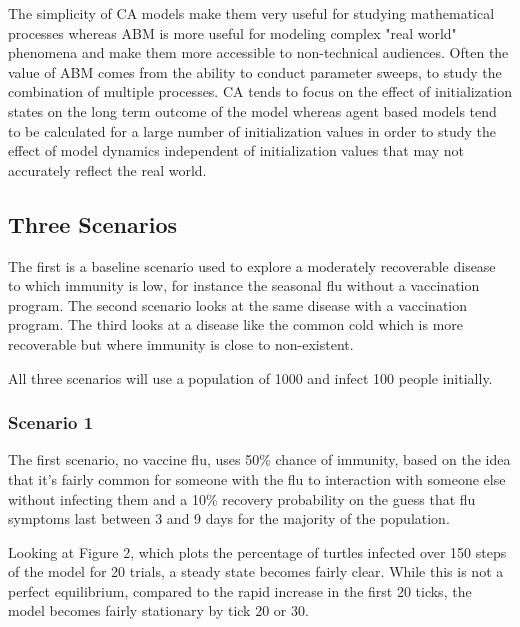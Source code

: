 \documentclass[11pt]{article} %
\begin{document}
The simplicity of CA models make them very useful for studying mathematical processes whereas ABM is more useful for modeling complex "real world" phenomena and make them more accessible to non-technical audiences. Often the value of ABM comes from the ability to conduct parameter sweeps, to study the combination of multiple processes. CA tends to focus on the effect of initialization states on the long term outcome of the model whereas agent based models tend to be calculated for a large number of initialization values in order to study the effect of model dynamics independent of initialization values that may not accurately reflect the real world. 

\subsection{Three Scenarios}

The first is a baseline scenario used to explore a moderately recoverable disease to which immunity is low, for instance the seasonal flu without a vaccination program. The second scenario looks at the same disease with a vaccination program. The third looks at a disease like the common cold which is more recoverable but where immunity is close to non-existent. 

All three scenarios will use a population of 1000 and infect 100 people initially. 

\subsubsection{Scenario 1}

The first scenario, no vaccine flu, uses 50\% chance of immunity, based on the idea that it's fairly common for someone with the flu to interaction with someone else without infecting them and a 10\% recovery probability on the guess that flu symptoms last between 3 and 9 days for the majority of the population.


Looking at Figure 2, which plots the percentage of turtles infected over 150 steps of the model for 20 trials, a steady state becomes fairly clear. While this is not a perfect equilibrium, compared to the rapid increase in the first 20 ticks, the model becomes fairly stationary by tick 20 or 30.   
\end{document}
